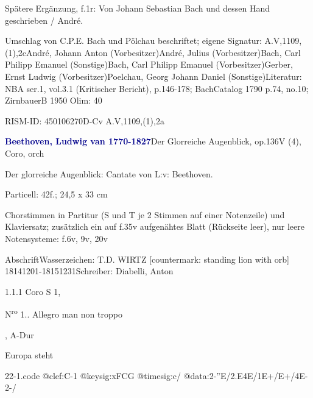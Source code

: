 \documentclass[a4paper, twocolumn, 11pt]{book}
\begin{document}
\newline %
\par Spätere Ergänzung, f.1r: {\textquotedbl}Von Johann Sebastian Bach und dessen Hand geschrieben / André.{\textquotedbl}
\par Umschlag von C.P.E. Bach und Pölchau beschriftet; eigene Signatur: A.V,1109,(1),2c\newline André, Johann Anton  (Vorbesitzer)\newline André, Julius  (Vorbesitzer)\newline Bach, Carl Philipp Emanuel  (Sonstige)\newline Bach, Carl Philipp Emanuel  (Vorbesitzer)\newline Gerber, Ernst Ludwig  (Vorbesitzer)\newline Poelchau, Georg Johann Daniel  (Sonstige)\newline Literatur: NBA  ser.1, vol.3.1 (Kritischer Bericht), p.146-178; BachCatalog 1790  p.74, no.10; ZirnbauerB 1950  \newline Olim: 40
\par RISM-ID: 450106270\newline D-Cv  A.V,1109,(1),2a
\par \vspace{16pt} \textcolor{darkblue}{\textbf{Beethoven, Ludwig van  1770-1827}}\hfillplus{[22]}\newline Der Glorreiche Augenblick, op.136\newline V (4), Coro, orch
\par \begin{itshape} Der glorreiche Augenblick: Cantate von L:v: Beethoven.\end{itshape} 
\par \textcolor{darkblue}{}  Particell: 42f.; 24,5 x 33 cm\newline \begin{small} Chorstimmen in Partitur (S und T je 2 Stimmen auf einer Notenzeile) und Klaviersatz; zusätzlich ein auf f.35v aufgenähtes Blatt (Rückseite leer), nur leere Notensysteme: f.6v, 9v, 20v\end{small} \newline Abschrift\newline Wasserzeichen: T.D. WIRTZ [countermark: standing lion with orb]  18141201-18151231\newline Schreiber: Diabelli, Anton
\par 1.1.1  Coro S 1, \begin{itshape}N\textsuperscript{r}\textsuperscript{o} 1.. Allegro man non troppo\end{itshape}, A-Dur\newline \begin{footnotesize} Europa steht \end{footnotesize}  
\begin{filecontents*}{22-1.code}
@clef:C-1
@keysig:xFCG
@timesig:c/
@data:2-''E/2.E4E/1E+/E+/4E-2-/
\end{filecontents*}
\end{document}
